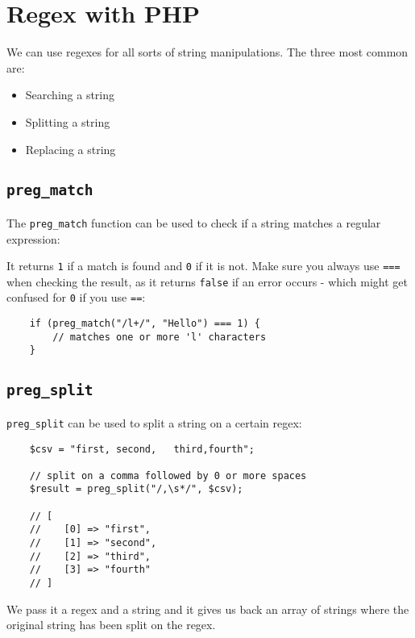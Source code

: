 \section{Regex with PHP}

We can use regexes for all sorts of string manipulations. The three most common are:

\begin{itemize}
    \item Searching a string
    \item Splitting a string
    \item Replacing a string
\end{itemize}


\subsection{\texttt{preg\_match}}

The \texttt{preg\_match} function can be used to check if a string matches a regular expression:


It returns \texttt{1} if a match is found and \texttt{0} if it is not. Make sure you always use \texttt{===} when checking the result, as it returns \texttt{false} if an error occurs - which might get confused for \texttt{0} if you use \texttt{==}:

\begin{verbatim}
    if (preg_match("/l+/", "Hello") === 1) {
        // matches one or more 'l' characters
    }
\end{verbatim}


\subsection{\texttt{preg\_split}}

\texttt{preg\_split} can be used to split a string on a certain regex:

\begin{verbatim}
    $csv = "first, second,   third,fourth";

    // split on a comma followed by 0 or more spaces
    $result = preg_split("/,\s*/", $csv);

    // [
    //    [0] => "first",
    //    [1] => "second",
    //    [2] => "third",
    //    [3] => "fourth"
    // ]
\end{verbatim}

We pass it a regex and a string and it gives us back an array of strings where the original string has been split on the regex.

